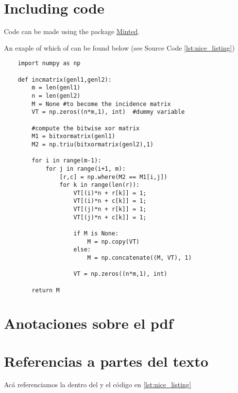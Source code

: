 \tinylipsum

\section*{Including code}

Code can be made using the package
\href{https://www.sharelatex.com/learn/Code\_Highlighting\_with\_minted}{Minted}.

An exaple of which of can be found below (see Source Code \ref{lst:nice_listing})

\begin{listing}[H]
	\begin{verbatim}
	import numpy as np

	def incmatrix(genl1,genl2):
	    m = len(genl1)
	    n = len(genl2)
	    M = None #to become the incidence matrix
	    VT = np.zeros((n*m,1), int)  #dummy variable

	    #compute the bitwise xor matrix
	    M1 = bitxormatrix(genl1)
	    M2 = np.triu(bitxormatrix(genl2),1)

	    for i in range(m-1):
	        for j in range(i+1, m):
	            [r,c] = np.where(M2 == M1[i,j])
	            for k in range(len(r)):
	                VT[(i)*n + r[k]] = 1;
	                VT[(i)*n + c[k]] = 1;
	                VT[(j)*n + r[k]] = 1;
	                VT[(j)*n + c[k]] = 1;

	                if M is None:
	                    M = np.copy(VT)
	                else:
	                    M = np.concatenate((M, VT), 1)

	                VT = np.zeros((n*m,1), int)

	    return M
	\end{verbatim}
  \label{lst:nice_listing}
\end{listing}

\section*{Anotaciones sobre el pdf}

\tinylipsum {} \tinylipsum {} \tinylipsum

\section*{Referencias a partes del texto}
Acá referenciamos la  dentro del  y el código en \ref{lst:nice_listing}
